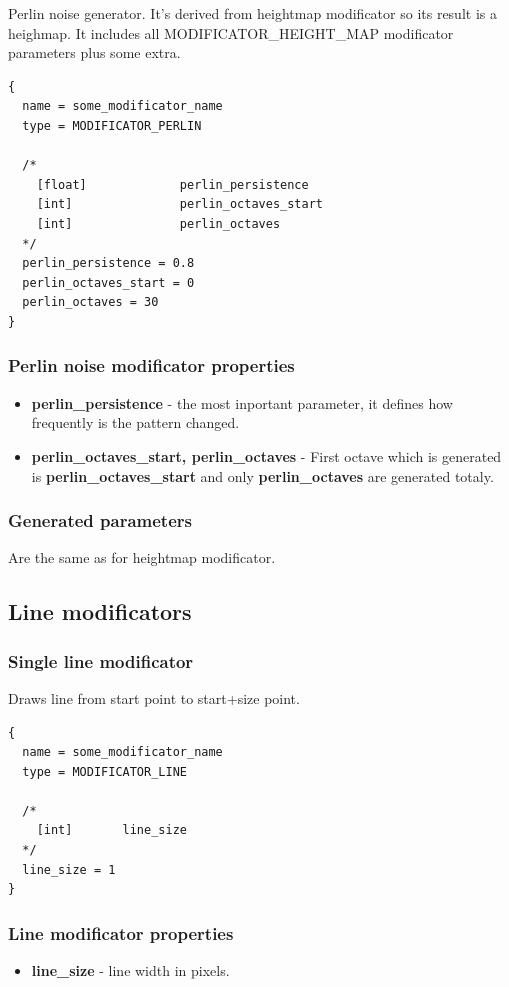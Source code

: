 \documentclass[9pt]{article}
\begin{document}
Perlin noise generator. It's derived from heightmap modificator
so its result is a heighmap. It includes all MODIFICATOR\_HEIGHT\_MAP modificator 
parameters plus some extra.

\begin{verbatim}
{
  name = some_modificator_name
  type = MODIFICATOR_PERLIN

  /*
    [float]             perlin_persistence
    [int]               perlin_octaves_start
    [int]               perlin_octaves
  */
  perlin_persistence = 0.8
  perlin_octaves_start = 0
  perlin_octaves = 30
}
\end{verbatim}
\subsubsection*{Perlin noise modificator properties}
\begin{itemize}
\item{\bf perlin\_persistence} - the most inportant parameter, it defines how frequently
is the pattern changed.
\item{\bf perlin\_octaves\_start, perlin\_octaves} - First octave which is generated 
is {\bf perlin\_octaves\_start} and only {\bf perlin\_octaves} are generated totaly.
\end{itemize}

\subsubsection*{Generated parameters}
Are the same as for heightmap modificator.

\newpage
\subsection{Line modificators}
\subsubsection{Single line modificator}

Draws line from start point to start+size point.

\begin{verbatim}
{
  name = some_modificator_name
  type = MODIFICATOR_LINE

  /*
    [int]       line_size    
  */
  line_size = 1
}
\end{verbatim}
\subsubsection*{Line modificator properties}
\begin{itemize}
\item{\bf line\_size} - line width in pixels.
\end{itemize}
\end{document}
